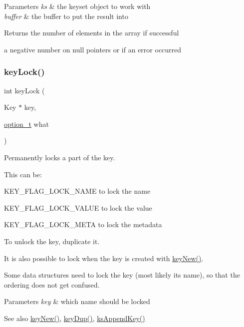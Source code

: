 \begin{DoxyParams}{Parameters}
{\em ks} & the keyset object to work with \\
\hline
{\em buffer} & the buffer to put the result into \\
\hline
\end{DoxyParams}
\begin{DoxyReturn}{Returns}
the number of elements in the array if successful 

a negative number on null pointers or if an error occurred 
\end{DoxyReturn}
\mbox{\label{group__api_ga2dd8d2650e59a90e933c631267bfbb85}} 
\subsubsection{\texorpdfstring{key\+Lock()}{keyLock()}}
{\footnotesize\ttfamily int key\+Lock (\begin{DoxyParamCaption}\item[{Key $\ast$}]{key,  }\item[{\hyperlink{group__keyset_ga98a3d6a4016c9dad9cbd1a99a9c2a45a}{option\+\_\+t}}]{what }\end{DoxyParamCaption})}



Permanently locks a part of the key. 

This can be\+:
\begin{DoxyItemize}
\item K\+E\+Y\+\_\+\+F\+L\+A\+G\+\_\+\+L\+O\+C\+K\+\_\+\+N\+A\+ME to lock the name
\item K\+E\+Y\+\_\+\+F\+L\+A\+G\+\_\+\+L\+O\+C\+K\+\_\+\+V\+A\+L\+UE to lock the value
\item K\+E\+Y\+\_\+\+F\+L\+A\+G\+\_\+\+L\+O\+C\+K\+\_\+\+M\+E\+TA to lock the metadata
\end{DoxyItemize}

To unlock the key, duplicate it.

It is also possible to lock when the key is created with \hyperlink{group__key_gad23c65b44bf48d773759e1f9a4d43b89}{key\+New()}.

Some data structures need to lock the key (most likely its name), so that the ordering does not get confused.


\begin{DoxyParams}{Parameters}
{\em key} & which name should be locked\\
\hline
\end{DoxyParams}
\begin{DoxySeeAlso}{See also}
\hyperlink{group__key_gad23c65b44bf48d773759e1f9a4d43b89}{key\+New()}, \hyperlink{group__key_gae6ec6a60cc4b8c1463fa08623d056ce3}{key\+Dup()}, \hyperlink{group__keyset_gaa5a1d467a4d71041edce68ea7748ce45}{ks\+Append\+Key()} 
\end{DoxySeeAlso}

